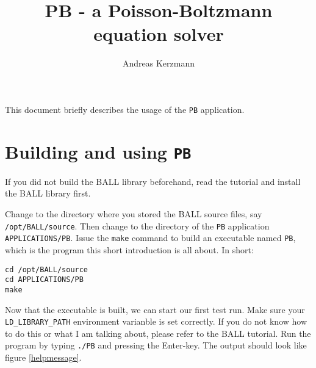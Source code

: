 \documentclass[12pt,twoside,a4paper]{article}
\author{Andreas Kerzmann}
\title{PB - a Poisson-Boltzmann equation solver}
\begin{document}
\maketitle

This document briefly describes the usage of the {\tt PB} application.

\section{Building and using {\tt PB}}

If you did not build the BALL library beforehand, read the tutorial and
install the BALL library first.

Change to the directory where you stored the BALL source files, say {\tt
/opt/BALL/source}. Then change to the directory of the {\tt PB}
application {\tt APPLICATIONS/PB}. Issue the {\tt make} command to build an
executable named {\tt PB}, which is the program this short introduction is
all about. In short:
\begin{verbatim}
cd /opt/BALL/source
cd APPLICATIONS/PB
make
\end{verbatim}

Now that the executable is built, we can start our first test run. Make sure
your {\tt LD\_LIBRARY\_PATH} environment varianble is set correctly. If you
do not know how to do this or what I am talking about, please refer to the
BALL tutorial. Run the program by typing {\tt ./PB} and pressing the
Enter-key. The output should look like figure \ref{helpmessage}.
\end{document}
